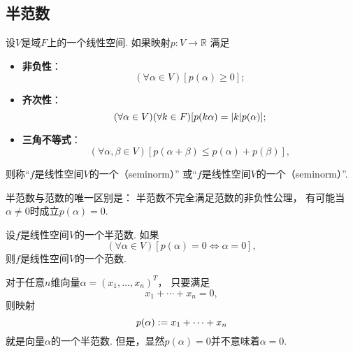 \subsection{半范数}
\begin{definition}
设\(V\)是域\(F\)上的一个线性空间.
如果映射\(p\colon V \to \mathbb{R}\)
满足\begin{itemize}
	\item {\rm\bf 非负性}：\begin{equation*}
		(\forall \alpha \in V)
		[p(\alpha) \geq 0];
	\end{equation*}

	\item {\rm\bf 齐次性}：\begin{equation*}
		(\forall \alpha \in V)
		(\forall k \in F)
		[
			p(k \alpha) = \abs{k} p(\alpha)
		];
	\end{equation*}

	\item {\rm\bf 三角不等式}：\begin{equation*}
		(\forall \alpha,\beta \in V)
		[
			p(\alpha+\beta) \leq p(\alpha) + p(\beta)
		],
	\end{equation*}
\end{itemize}
则称“\(f\)是线性空间\(V\)的一个（seminorm）”
或“\(f\)是线性空间\(V\)的一个（seminorm）”.
\end{definition}

半范数与范数的唯一区别是：
半范数不完全满足范数的非负性公理，
有可能当\(\alpha\neq0\)时成立\(p(\alpha) = 0\).
\begin{proposition}
设\(f\)是线性空间\(V\)的一个半范数.
如果\begin{equation*}
	(\forall \alpha \in V)
	[
		p(\alpha) = 0
		\iff
		\alpha = 0
	],
\end{equation*}
则\(f\)是线性空间\(V\)的一个范数.
\end{proposition}

\begin{example}
对于任意\(n\)维向量\(\alpha = (x_1,\dotsc,x_n)^T\)，
只要满足\begin{equation*}
	x_1 + \dotsb + x_n = 0,
\end{equation*}
则映射\begin{equation*}
	p(\alpha)
	:=
	x_1 + \dotsb + x_n
\end{equation*}
就是向量\(\alpha\)的一个半范数.
但是，显然\(p(\alpha) = 0\)并不意味着\(\alpha = 0\).
\end{example}

